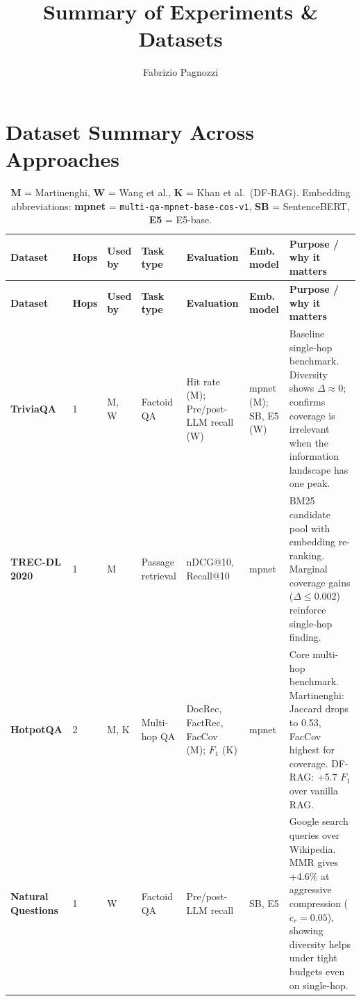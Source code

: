 \documentclass[11pt,a4paper]{article}
\title{Summary of Experiments \& Datasets}
\author{Fabrizio Pagnozzi}
\date{}
\begin{document}
\maketitle
\tableofcontents

\newpage

\section{Dataset Summary Across Approaches}

\begin{small}
	\begin{longtable}{@{}p{2.5cm}p{0.8cm}p{1.2cm}p{2.4cm}p{2.2cm}p{1.8cm}p{\dimexpr\textwidth-2.5cm-0.8cm-1.2cm-2.4cm-2.2cm-1.8cm-12\tabcolsep\relax}@{}}
		\caption{\textbf{M} = Martinenghi, \textbf{W} = Wang et al., \textbf{K} = Khan et al.\ (DF-RAG). Embedding abbreviations: \textbf{mpnet} = \texttt{multi-qa-mpnet-base-cos-v1}, \textbf{SB} = SentenceBERT, \textbf{E5} = E5-base.}
		\label{tab:dataset-summary} \\
		\toprule
		\textbf{Dataset} & \textbf{Hops} & \textbf{Used by} & \textbf{Task type} & \textbf{Evaluation} & \textbf{Emb. model} & \textbf{Purpose / why it matters} \\
		\midrule
		\endfirsthead
		\toprule
		\textbf{Dataset} & \textbf{Hops} & \textbf{Used by} & \textbf{Task type} & \textbf{Evaluation} & \textbf{Emb. model} & \textbf{Purpose / why it matters} \\
		\midrule
		\endhead
		\midrule
		\endfoot
		\bottomrule
		\endlastfoot
		\textbf{TriviaQA} & 1 & M, W & Factoid QA & Hit rate (M); Pre/post-LLM recall (W) & mpnet (M); SB, E5 (W) & Baseline single-hop benchmark. Diversity shows $\Delta \approx 0$; confirms coverage is irrelevant when the information landscape has one peak. \\
		\addlinespace
		\textbf{TREC-DL 2020} & 1 & M & Passage retrieval & nDCG@10, Recall@10 & mpnet & BM25 candidate pool with embedding re-ranking. Marginal coverage gains ($\Delta \leq 0.002$) reinforce single-hop finding. \\
		\addlinespace
		\textbf{HotpotQA} & 2 & M, K & Multi-hop QA & DocRec, FactRec, FacCov (M); $F_1$ (K) & mpnet & Core multi-hop benchmark. Martinenghi: Jaccard drops to 0.53, FacCov highest for coverage. DF-RAG: +5.7 $F_1$ over vanilla RAG. \\
		\addlinespace
		\textbf{Natural Questions} & 1 & W & Factoid QA & Pre/post-LLM recall & SB, E5 & Google search queries over Wikipedia. MMR gives +4.6\% at aggressive compression ($c_r = 0.05$), showing diversity helps under tight budgets even on single-hop. \\

\end{longtable}
\end{small}
\end{document}

